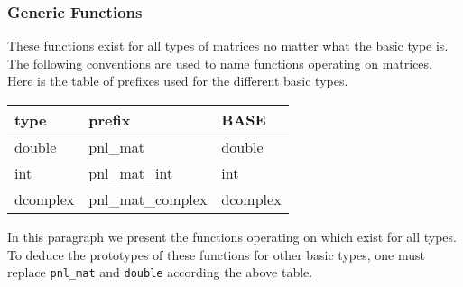 \subsubsection{Generic Functions}
These functions exist for all types of matrices no matter what the basic type
is. The following conventions are used to name functions operating on matrices.
Here is the table of prefixes used for the different basic types.

\begin{center}
  \begin{tabular}[t]{lll}
    type & prefix & BASE\\
    \hline
    double & pnl_mat & double \\
    \hline
    int & pnl_mat_int & int \\
    \hline
    dcomplex & pnl_mat_complex & dcomplex
  \end{tabular}
\end{center}

In this paragraph we present the functions operating on 
which exist for all types. To deduce the prototypes of these functions for
other basic types, one must replace {\tt pnl_mat} and {\tt double} according
the above table.


